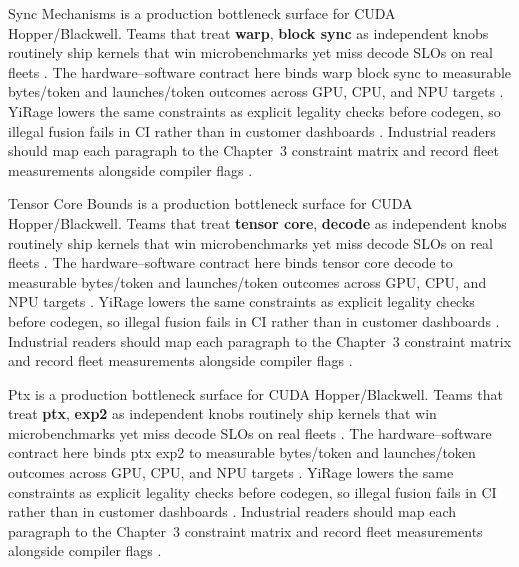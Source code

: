Sync Mechanisms is a production bottleneck surface for CUDA Hopper/Blackwell. Teams that treat \textbf{warp}, \textbf{block sync} as independent knobs routinely ship kernels that win microbenchmarks yet miss decode SLOs on real fleets \citep{kwon2023vllm,patel2025llminference}. The hardware--software contract here binds warp block sync to measurable bytes/token and launches/token outcomes across GPU, CPU, and NPU targets \citep{nvidia2024cudagraphs,taxbreak2026}. YiRage lowers the same constraints as explicit legality checks before codegen, so illegal fusion fails in CI rather than in customer dashboards \citep{liu2024deepseekv3,memoryfloor2026}. Industrial readers should map each paragraph to the Chapter~3 constraint matrix and record fleet measurements alongside compiler flags \citep{patel2025llminference,nvidia2022hopper}.

Tensor Core Bounds is a production bottleneck surface for CUDA Hopper/Blackwell. Teams that treat \textbf{tensor core}, \textbf{decode} as independent knobs routinely ship kernels that win microbenchmarks yet miss decode SLOs on real fleets \citep{nvidia2024cudagraphs,taxbreak2026}. The hardware--software contract here binds tensor core decode to measurable bytes/token and launches/token outcomes across GPU, CPU, and NPU targets \citep{liu2024deepseekv3,memoryfloor2026}. YiRage lowers the same constraints as explicit legality checks before codegen, so illegal fusion fails in CI rather than in customer dashboards \citep{patel2025llminference,nvidia2022hopper}. Industrial readers should map each paragraph to the Chapter~3 constraint matrix and record fleet measurements alongside compiler flags \citep{taxbreak2026,semianalysis2024tma}.

Ptx is a production bottleneck surface for CUDA Hopper/Blackwell. Teams that treat \textbf{ptx}, \textbf{exp2} as independent knobs routinely ship kernels that win microbenchmarks yet miss decode SLOs on real fleets \citep{liu2024deepseekv3,memoryfloor2026}. The hardware--software contract here binds ptx exp2 to measurable bytes/token and launches/token outcomes across GPU, CPU, and NPU targets \citep{patel2025llminference,nvidia2022hopper}. YiRage lowers the same constraints as explicit legality checks before codegen, so illegal fusion fails in CI rather than in customer dashboards \citep{taxbreak2026,semianalysis2024tma}. Industrial readers should map each paragraph to the Chapter~3 constraint matrix and record fleet measurements alongside compiler flags \citep{memoryfloor2026,amd2024xdna}.

